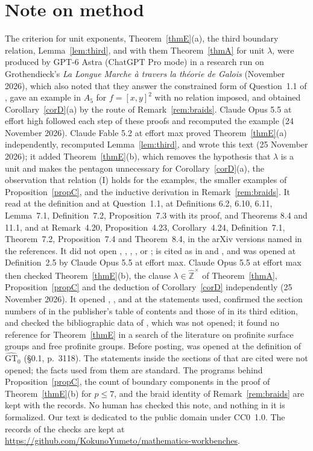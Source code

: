 \documentclass[11pt]{amsart}
\newcommand{\recordurl}{https://github.com/KokunoYumeto/mathematics-workbenches}
\theoremstyle{definition}
\theoremstyle{remark}
\newcommand{\Zh}{\widehat{\mathbb Z}}
\newcommand{\GTz}{\widehat{\mathrm{GT}}_0}
\begin{document}
\section*{Note on method}
The criterion for unit exponents, Theorem~\ref{thmE}(a), the third boundary relation, Lemma~\ref{lem:third}, and with them Theorem~\ref{thmA} for unit $\lambda$, were produced by GPT-6 Astra (ChatGPT Pro mode) in a research run on Grothendieck's \emph{La Longue Marche \`a travers la th\'eorie de Galois} (November 2026), which also noted that they answer the constrained form of Question~1.1 of \cite{LS}, gave an example in $A_5$ for $f=[x,y]^2$ with no relation imposed, and obtained Corollary~\ref{corD}(a) by the route of Remark~\ref{rem:braids}. Claude Opus 5.5 at effort high followed each step of these proofs and recomputed the example (24 November 2026). Claude Fable 5.2 at effort max proved Theorem~\ref{thmE}(a) independently, recomputed Lemma~\ref{lem:third}, and wrote this text (25 November 2026); it added Theorem~\ref{thmE}(b), which removes the hypothesis that $\lambda$ is a unit and makes the pentagon unnecessary for Corollary~\ref{corD}(a), the observation that relation (I) holds for the examples, the smaller examples of Proposition~\ref{propC}, and the inductive derivation in Remark~\ref{rem:braids}. It read \cite{LS} at the definition and at Question~1.1, \cite{BHR} at Definitions 6.2, 6.10, 6.11, Lemma~7.1, Definition~7.2, Proposition~7.3 with its proof, and Theorems 8.4 and 11.1, and \cite{Hor} at Remark~4.20, Proposition~4.23, Corollary~4.24, Definition~7.1, Theorem~7.2, Proposition~7.4 and Theorem~8.4, in the arXiv versions named in the references. It did not open \cite{D}, \cite{HS}, \cite{DG}, \cite{RZ}, \cite{Se} or \cite{Ch}; \cite{D} is cited as in \cite{Hor} and \cite{BHR}, and \cite{DG} was opened at Definition~2.5 by Claude Opus 5.5 at effort max. Claude Opus 5.5 at effort max then checked Theorem~\ref{thmE}(b), the clause $\lambda\in\Zh^\times$ of Theorem~\ref{thmA}, Proposition~\ref{propC} and the deduction of Corollary~\ref{corD} independently (25 November 2026). It opened \cite{LS}, \cite{Hor}, \cite{BHR} and \cite{F} at the statements used, confirmed the section numbers of \cite{RZ} in the publisher's table of contents and those of \cite{Se} in its third edition, and checked the bibliographic data of \cite{Ch}, which was not opened; it found no reference for Theorem~\ref{thmE} in a search of the literature on profinite surface groups and free profinite groups. Before posting, \cite{HS} was opened at the definition of $\GTz$ (\S0.1, p.~3118). The statements inside the sections of \cite{RZ} that are cited were not opened; the facts used from them are standard. The programs behind Proposition~\ref{propC}, the count of boundary components in the proof of Theorem~\ref{thmE}(b) for $p\le7$, and the braid identity of Remark~\ref{rem:braids} are kept with the records. No human has checked this note, and nothing in it is formalized. Our text is dedicated to the public domain under CC0~1.0. The records of the checks are kept at \url{\recordurl}.
\end{document}
